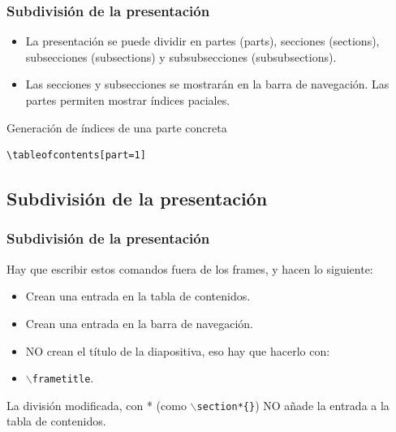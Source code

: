 \documentclass[aspectratio=1610]{beamer}%
\begin{document}
\begin{frame}[fragile]
\frametitle{\textbf{Subdivisión de la presentación}}
\justifying
 
 \begin{itemize}\justifying
  \item La presentación se puede dividir en partes (parts), secciones (sections), subsecciones (subsections) y subsubsecciones (subsubsections).
  \item Las secciones y subsecciones se mostrarán en la barra de navegación. Las partes permiten mostrar índices paciales.
\end{itemize}

\begin{exampleblock}{Generación de índices de una parte concreta}
   \lstset{language=}%
   \vspace{-0.7cm}
\begin{lstlisting}
\tableofcontents[part=1]
\end{lstlisting}\vspace{-0.3cm}

\end{exampleblock}
\end{frame}

\subsection{Subdivisión de la presentación}
\begin{frame}[fragile]
\frametitle{\textbf{Subdivisión de la presentación}}
\justifying
 Hay que escribir estos comandos fuera de los frames, y hacen lo siguiente:
 \begin{itemize}\justifying
  \item Crean una entrada en la tabla de contenidos.
  \item Crean una entrada en la barra de navegación.
  \item NO crean el título de la diapositiva, eso hay que hacerlo con:
  \item [] \texttt{$\backslash$frametitle}.
\end{itemize}

La división modificada, con * (como \texttt{$\backslash$section*\{\}}) NO añade la entrada a la tabla de contenidos.
\end{frame}
\end{document}
